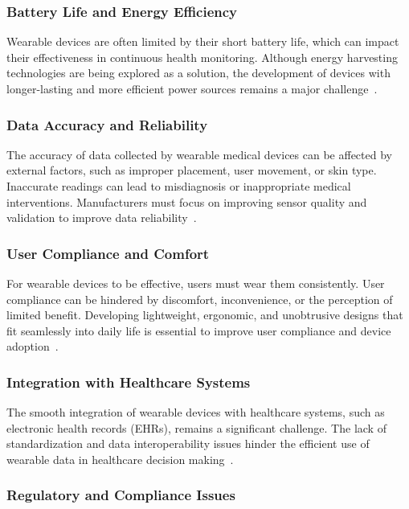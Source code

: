 \documentclass[journal]{IEEEtran}
\begin{document}
        \subsubsection{Battery Life and Energy Efficiency}

        Wearable devices are often limited by their short battery life, which can impact their effectiveness in continuous health monitoring. Although energy harvesting technologies are being explored as a solution, the development of devices with longer-lasting and more efficient power sources remains a major challenge~\cite{Ates2022}.

        \subsubsection{Data Accuracy and Reliability}

        The accuracy of data collected by wearable medical devices can be affected by external factors, such as improper placement, user movement, or skin type. Inaccurate readings can lead to misdiagnosis or inappropriate medical interventions. Manufacturers must focus on improving sensor quality and validation to improve data reliability~\cite{Lu2020}.

        \subsubsection{User Compliance and Comfort}

        For wearable devices to be effective, users must wear them consistently. User compliance can be hindered by discomfort, inconvenience, or the perception of limited benefit. Developing lightweight, ergonomic, and unobtrusive designs that fit seamlessly into daily life is essential to improve user compliance and device adoption~\cite{Luo2024}.

        \subsubsection{Integration with Healthcare Systems}

        The smooth integration of wearable devices with healthcare systems, such as electronic health records (EHRs), remains a significant challenge. The lack of standardization and data interoperability issues hinder the efficient use of wearable data in healthcare decision making~\cite{Ravizza2019}.

        \subsubsection{Regulatory and Compliance Issues}
\end{document}
